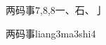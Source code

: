 \begin{entry}{两码事}{7,8,8}{⼀、⽯、⼅}
  \begin{phonetics}{两码事}{liang3ma3shi4}
  \end{phonetics}
\end{entry}
